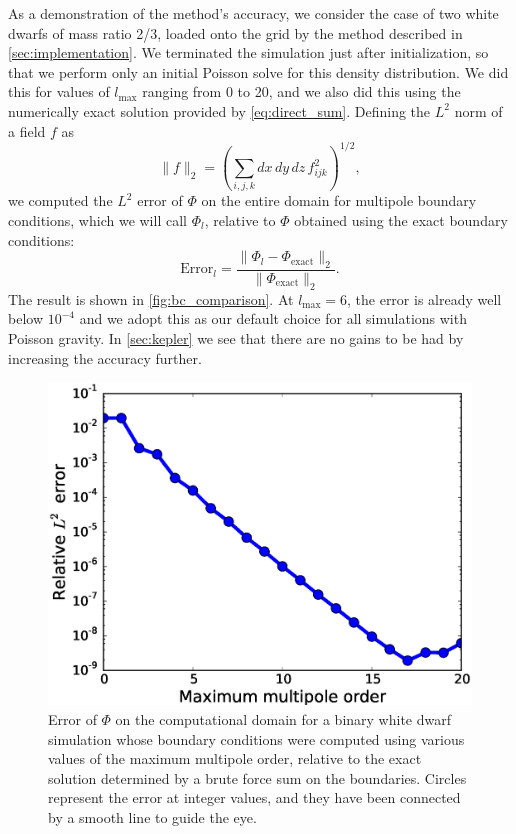 \documentclass[iop]{../emulateapj}
\begin{document}
As a demonstration of the method's accuracy, we consider the case of two 
white dwarfs of mass ratio 2/3, loaded onto the grid by the method described 
in \autoref{sec:implementation}. We terminated the simulation just after
initialization, so that we perform only an initial Poisson solve for this 
density distribution. We did this for values of $l_{\text{max}}$ ranging
from 0 to 20, and we also did this using the numerically exact solution 
provided by \autoref{eq:direct_sum}.  Defining the $L^2$
norm of a field $f$ as
\begin{equation}
  \| f \|_2 = \left(\sum_{i,j,k} dx\, dy\, dz\, f_{ijk}^2\right)^{1/2},
\end{equation}
we computed the $L^2$ error of $\Phi$ on the entire domain for multipole 
boundary conditions, which we will call $\Phi_l$, relative to $\Phi$ 
obtained using the exact boundary conditions:
\begin{equation}
  \text{Error}_l = \frac{\|\Phi_l - \Phi_{\text{exact}}\|_2}{\|\Phi_{\text{exact}}\|_2}.
\end{equation}
The result is shown in \autoref{fig:bc_comparison}. At $l_{\text{max}} = 6$,
the error is already well below $10^{-4}$ and we adopt this as our default 
choice for all simulations with Poisson gravity. In \autoref{sec:kepler} we 
see that there are no gains to be had by increasing the accuracy further. 
\begin{figure}[h]
  \centering
  \includegraphics[scale=0.45]{plots/bc_comparison}
  \caption{Error of $\Phi$ on the computational domain for a binary white dwarf simulation 
    whose boundary conditions were computed using various values of the maximum multipole order,
    relative to the exact solution determined by a brute force sum on the boundaries.
    Circles represent the error at integer values, and they have been connected by a smooth 
    line to guide the eye.\label{fig:bc_comparison}}
\end{figure}
\end{document}
